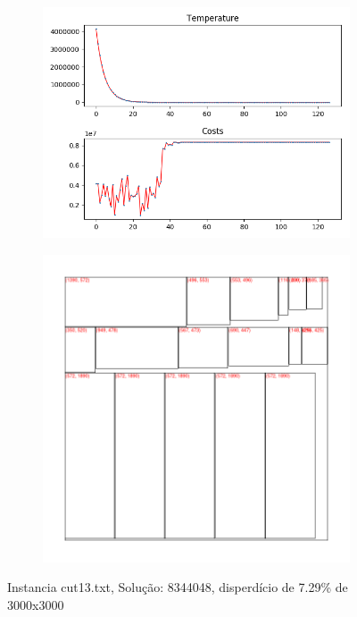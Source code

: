 \begin{figure}
\centering
\begin{subfigure}{.5\textwidth}
  \centering
  \includegraphics[width=1\linewidth]{results/cut13/1/plot}
  \label{fig:sub1}
\end{subfigure}%
\begin{subfigure}{.5\textwidth}
  \centering
  \includegraphics[width=1\linewidth]{results/cut13/1/cut}
  \label{fig:sub2}
\end{subfigure}
\caption{Instancia cut13.txt, Solução: 8344048, disperdício de 7.29\% de 3000x3000}
\label{fig:test}
\end{figure}


